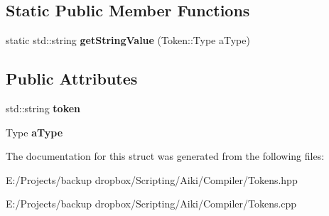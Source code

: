 \subsection*{Static Public Member Functions}
\begin{DoxyCompactItemize}
\item 
\hypertarget{a00025_ae6f28995197884ebeb2e22989a193a44}{static std\+::string {\bfseries get\+String\+Value} (Token\+::\+Type a\+Type)}\label{a00025_ae6f28995197884ebeb2e22989a193a44}

\end{DoxyCompactItemize}
\subsection*{Public Attributes}
\begin{DoxyCompactItemize}
\item 
\hypertarget{a00025_a290d52d875142e4728d4c23e1be7e316}{std\+::string {\bfseries token}}\label{a00025_a290d52d875142e4728d4c23e1be7e316}

\item 
\hypertarget{a00025_a8be912d99c08d7ac8669552abfd1392b}{Type {\bfseries a\+Type}}\label{a00025_a8be912d99c08d7ac8669552abfd1392b}

\end{DoxyCompactItemize}


The documentation for this struct was generated from the following files\+:\begin{DoxyCompactItemize}
\item 
E\+:/\+Projects/backup dropbox/\+Scripting/\+Aiki/\+Compiler/Tokens.\+hpp\item 
E\+:/\+Projects/backup dropbox/\+Scripting/\+Aiki/\+Compiler/Tokens.\+cpp\end{DoxyCompactItemize}

